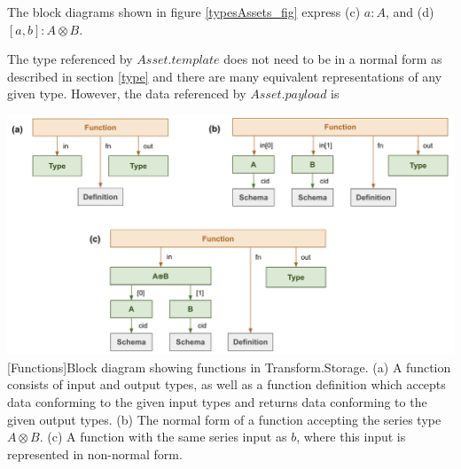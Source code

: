 \documentclass[9pt, oneside]{article}   	%
\begin{document}
\begin{multicols}{2}
The block diagrams shown in figure \ref{typesAssets_fig} express (c) $a : A$, and (d) $[a, b] : A \otimes B$. 

The type referenced by $Asset.template$ does not need to be in a normal form as described in section \ref{type} and there are many equivalent representations of any given type. However, the data referenced by $Asset.payload$ is

\end{multicols}
\begin{center}
\includegraphics[width=1\columnwidth]{fig_functions}
[Functions]{Block diagram showing functions in Transform.Storage. (a) A function consists of input and output types, as well as a function definition which accepts data conforming to the given input types and returns data conforming to the given output types. (b) The normal form of a function accepting the series type $A \otimes B$. (c) A function with the same series input as $b$, where this input is represented in non-normal form.}
\label{functions_fig}
\end{center}
\end{document}
